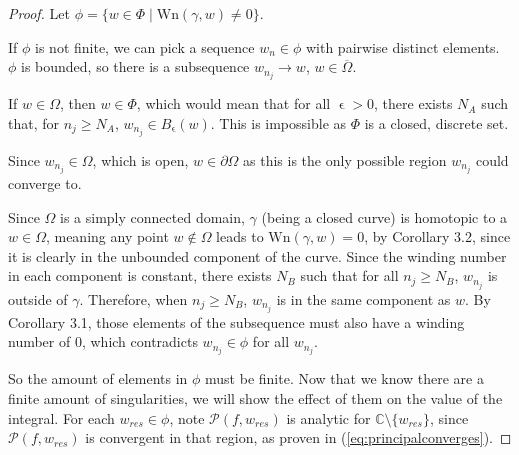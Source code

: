 \documentclass[a4paper]{article}
\def\Wind{\text{Wn}}
\begin{document}
\begin{proof}
Let $\phi = \{ w \in  \Phi \mid \Wind (\gamma,w) \neq 0\}$. 

If $\phi$ is not finite, we can pick a sequence $w_{n} \in \phi$ with pairwise distinct elements. $\phi$ is bounded, so there is a subsequence $w_{n_{j}} \rightarrow w$, $w \in \overline{\Omega}$.

If $w \in \Omega$, then $w \in \Phi$, which would mean that for all $\upvarepsilon > 0  $, there exists $N_{A}$ such that, for $n_{j} \geq N_{A}$, $w_{n_{j}} \in B_{\upvarepsilon}(w)$. This is impossible as $\Phi$ is a closed, discrete set.

Since $w_{n_{j}} \in \Omega$, which is open, $w \in \partial \Omega$ as this is the only possible region $w_{n_{j}}$ could converge to.

Since $\Omega$ is a simply connected domain, $\gamma$ (being a closed curve) is homotopic to a $w \in \Omega$, meaning any point $w \notin \Omega$ leads to $\Wind (\gamma,w)=0$, by Corollary 3.2, since it is clearly in the unbounded component of the curve. Since the winding number in each component is constant, there exists $N_{B}$ such that for all $n_{j} \geq N_{B} $, $w_{n_{j}}$ is outside of $\gamma$. Therefore, when $n_{j} \geq N_{B}$, $w_{n_{j}}$ is in the same component as $w$. By Corollary 3.1, those elements of the subsequence must also have a winding number of $0$, which contradicts $w_{n_{j}} \in \phi$ for all $w_{n_{j}}$. 

So the amount of elements in $\phi$ must be finite. Now that we know there are a finite amount of singularities, we will show the effect of them on the value of the integral. For each $w_{res} \in \phi$, note $\mathcal{P}(f,w_{res})$ is analytic for $\mathbb{C}\setminus \{w_{res}\}$, since $\mathcal{P}(f,w_{res})$ is convergent in that region, as proven in (\ref{eq:principalconverges}). 


\end{proof}
\end{document}
